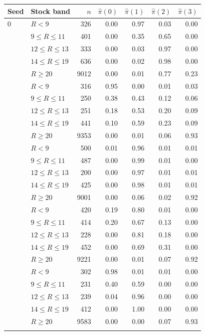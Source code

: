 \begin{tabular}{llrrrrr}
\toprule
Seed & Stock band & $n$ & $\hat\pi(0)$ & $\hat\pi(1)$ & $\hat\pi(2)$ & $\hat\pi(3)$ \\
\midrule
0 & $R<9$ & 326 & 0.00 & 0.97 & 0.03 & 0.00 \\
 & $9\le R\le 11$ & 401 & 0.00 & 0.35 & 0.65 & 0.00 \\
 & $12\le R\le 13$ & 333 & 0.00 & 0.03 & 0.97 & 0.00 \\
 & $14\le R\le 19$ & 636 & 0.00 & 0.02 & 0.98 & 0.00 \\
 & $R\ge 20$ & 9012 & 0.00 & 0.01 & 0.77 & 0.23 \\
\addlinespace
1 & $R<9$ & 316 & 0.95 & 0.00 & 0.01 & 0.03 \\
 & $9\le R\le 11$ & 250 & 0.38 & 0.43 & 0.12 & 0.06 \\
 & $12\le R\le 13$ & 251 & 0.18 & 0.53 & 0.20 & 0.09 \\
 & $14\le R\le 19$ & 441 & 0.10 & 0.59 & 0.23 & 0.09 \\
 & $R\ge 20$ & 9353 & 0.00 & 0.01 & 0.06 & 0.93 \\
\addlinespace
2 & $R<9$ & 500 & 0.01 & 0.96 & 0.01 & 0.01 \\
 & $9\le R\le 11$ & 487 & 0.00 & 0.99 & 0.01 & 0.00 \\
 & $12\le R\le 13$ & 200 & 0.00 & 0.97 & 0.01 & 0.01 \\
 & $14\le R\le 19$ & 425 & 0.00 & 0.98 & 0.01 & 0.01 \\
 & $R\ge 20$ & 9001 & 0.00 & 0.06 & 0.02 & 0.92 \\
\addlinespace
3 & $R<9$ & 420 & 0.19 & 0.80 & 0.01 & 0.00 \\
 & $9\le R\le 11$ & 414 & 0.20 & 0.67 & 0.13 & 0.00 \\
 & $12\le R\le 13$ & 228 & 0.00 & 0.81 & 0.18 & 0.00 \\
 & $14\le R\le 19$ & 452 & 0.00 & 0.69 & 0.31 & 0.00 \\
 & $R\ge 20$ & 9221 & 0.00 & 0.01 & 0.07 & 0.92 \\
\addlinespace
4 & $R<9$ & 302 & 0.98 & 0.01 & 0.01 & 0.00 \\
 & $9\le R\le 11$ & 231 & 0.40 & 0.59 & 0.00 & 0.00 \\
 & $12\le R\le 13$ & 239 & 0.04 & 0.96 & 0.00 & 0.00 \\
 & $14\le R\le 19$ & 412 & 0.00 & 1.00 & 0.00 & 0.00 \\
 & $R\ge 20$ & 9583 & 0.00 & 0.00 & 0.07 & 0.93 \\
\addlinespace
\bottomrule
\end{tabular}
